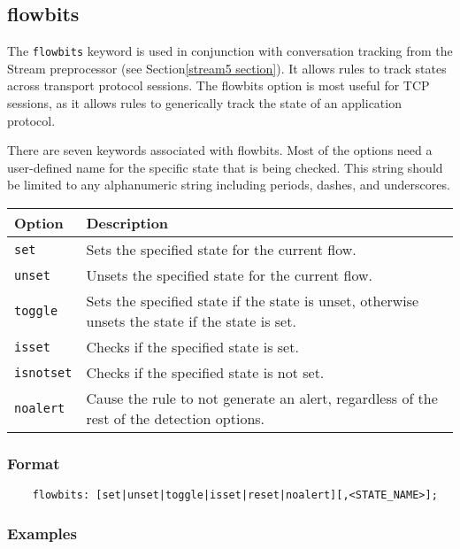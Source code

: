 \documentclass[english]{report}
\begin{document}
\subsection{flowbits}
\label{flowbits}

The \texttt{flowbits} keyword is used in conjunction with conversation tracking
from the Stream preprocessor (see Section\ref{stream5 section}).  It allows
rules to track states across transport protocol sessions.  The flowbits option
is most useful for TCP sessions, as it allows rules to generically track the
state of an application protocol.

There are seven keywords associated with flowbits. Most of the options need a
user-defined name for the specific state that is being checked.  This string
should be limited to any alphanumeric string including periods, dashes, and
underscores.

\begin{tabular}{| l | p{4.5in} |}
\hline
{\bf Option} & {\bf Description}\\
\hline
\hline
\texttt{set} & Sets the specified state for the current flow.\\
\hline
\texttt{unset} & Unsets the specified state for the current flow.\\
\hline
\texttt{toggle} & Sets the specified state if the state is unset, otherwise unsets the 
state if the state is set.\\
\hline
\texttt{isset} & Checks if the specified state is set.\\
\hline
\texttt{isnotset} & Checks if the specified state is not set.\\
\hline
\texttt{noalert} & Cause the rule to not generate an alert, regardless of the rest of the detection options.\\
\hline
\end{tabular}

\subsubsection{Format}

\begin{verbatim}
    flowbits: [set|unset|toggle|isset|reset|noalert][,<STATE_NAME>];
\end{verbatim}

\subsubsection{Examples}
\end{document}
